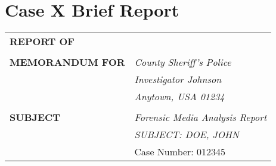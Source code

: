 
\section{Case X Brief Report}


\begin{longtable}{p{}p{}}
\textbf{REPORT OF} &  \underline{\hspace{5cm}}\\
&\\
\textbf{MEMORANDUM FOR} & \textit{County Sheriff's Police} \\
& \textit{Investigator Johnson} \\
& \textit{Anytown, USA 01234}\\
&\\
\textbf{SUBJECT} & \textit{Forensic Media Analysis Report}\\
& \textit{SUBJECT: DOE, JOHN }\\
& Case Number: 012345\\
\end{longtable}

